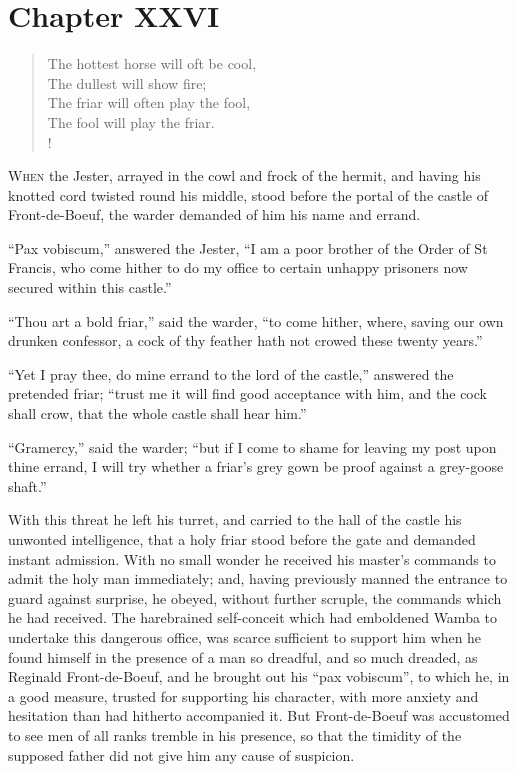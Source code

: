 \chapter{Chapter XXVI}

\begin{verse}
The hottest horse will oft be cool,\\
The dullest will show fire;\\
The friar will often play the fool,\\
The fool will play the friar.\\!
\end{verse}

\lettrine{W}{hen} the Jester, arrayed in the cowl and frock of the hermit,
and having
his knotted cord twisted round his middle, stood before the portal of
the castle of Front-de-Boeuf, the warder demanded of him his name and
errand.

``Pax vobiscum,'' answered the Jester, ``I am a poor brother of the
Order of St Francis, who come hither to do my office to certain unhappy
prisoners now secured within this castle.''

``Thou art a bold friar,'' said the warder, ``to come hither, where,
saving our own drunken confessor, a cock of thy feather hath not crowed
these twenty years.''

``Yet I pray thee, do mine errand to the lord of the castle,'' answered
the pretended friar; ``trust me it will find good acceptance with him,
and the cock shall crow, that the whole castle shall hear him.''

``Gramercy,'' said the warder; ``but if I come to shame for leaving my
post upon thine errand, I will try whether a friar's grey gown be proof
against a grey-goose shaft.''

With this threat he left his turret, and carried to the hall of the
castle his unwonted intelligence, that a holy friar stood before the
gate and demanded instant admission. With no small wonder he received
his master's commands to admit the holy man immediately; and, having
previously manned the entrance to guard against surprise, he obeyed,
without further scruple, the commands which he had received. The
harebrained self-conceit which had emboldened Wamba to undertake this
dangerous office, was scarce sufficient to support him when he found
himself in the presence of a man so dreadful, and so much dreaded, as
Reginald Front-de-Boeuf, and he brought out his ``pax vobiscum'', to
which he, in a good measure, trusted for supporting his character, with
more anxiety and hesitation than had hitherto accompanied it. But
Front-de-Boeuf was accustomed to see men of all ranks tremble in his
presence, so that the timidity of the supposed father did not give him
any cause of suspicion.

